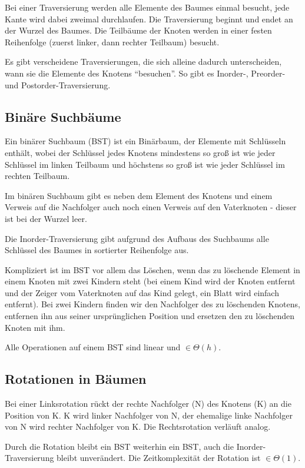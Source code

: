 \documentclass[12pt]{article}
\begin{document}
Bei einer Traversierung werden alle Elemente des Baumes einmal besucht, jede Kante wird dabei zweimal durchlaufen. Die Traversierung beginnt und endet an der Wurzel des Baumes. Die Teilbäume der Knoten werden in einer festen Reihenfolge (zuerst linker, dann rechter Teilbaum) besucht.

Es gibt verscheidene Traversierungen, die sich alleine dadurch unterscheiden, wann sie die Elemente des Knotens \enquote{besuchen}. So gibt es Inorder-, Preorder- und Postorder-Traversierung.

\subsection{Binäre Suchbäume}

Ein binärer Suchbaum (BST) ist ein Binärbaum, der Elemente mit Schlüsseln enthält, wobei der Schlüssel jedes Knotens mindestens so groß ist wie jeder Schlüssel im linken Teilbaum und höchstens so groß ist wie jeder Schlüssel im rechten Teilbaum.

Im binären Suchbaum gibt es neben dem Element des Knotens und einem Verweis auf die Nachfolger auch noch einen Verweis auf den Vaterknoten - dieser ist bei der Wurzel leer.

Die Inorder-Traversierung gibt aufgrund des Aufbaus des Suchbaums alle Schlüssel des Baumes in sortierter Reihenfolge aus.

Kompliziert ist im BST vor allem das Löschen, wenn das zu löschende Element in einem Knoten mit zwei Kindern steht (bei einem Kind wird der Knoten entfernt und der Zeiger vom Vaterknoten auf das Kind gelegt, ein Blatt wird einfach entfernt). Bei zwei Kindern finden wir den Nachfolger des zu löschenden Knotens, entfernen ihn aus seiner ursprünglichen Position und ersetzen den zu löschenden Knoten mit ihm.

Alle Operationen auf einem BST sind linear und $\in \Theta(h)$.

\subsection{Rotationen in Bäumen}

Bei einer Linksrotation rückt der rechte Nachfolger (N) des Knotens (K) an die Position von K. K wird linker Nachfolger von N, der ehemalige linke Nachfolger von N wird rechter Nachfolger von K. Die Rechtsrotation verläuft analog.

Durch die Rotation bleibt ein BST weiterhin ein BST, auch die Inorder-Traversierung bleibt unverändert. Die Zeitkomplexität der Rotation ist $\in \Theta(1)$.
\end{document}
